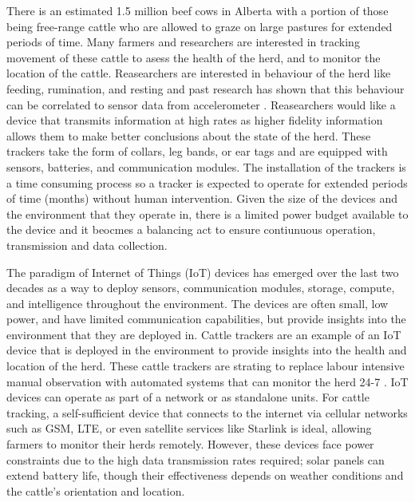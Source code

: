 \documentclass[10pt]{cai}
\begin{document}
There is an estimated 1.5 million beef cows in Alberta with a portion of those being free-range cattle who are allowed to graze on large pastures for extended periods of time.
Many farmers and researchers are interested in tracking movement of these cattle to asess the health of the herd, and to monitor the location of the cattle.
Reasearchers are interested in behaviour of the herd like feeding, rumination, and resting and past research has shown that this behaviour can be correlated to sensor data from accelerometer \cite{unoldIoTBasedCowHealth2020}.
Reasearchers would like a device that transmits information at high rates as higher fidelity information allows them to make better conclusions about the state of the herd.
These trackers take the form of collars, leg bands, or ear tags and are equipped with sensors, batteries, and communication modules.
The installation of the trackers is a time consuming process so a tracker is expected to operate for extended periods of time (months) without human intervention.
Given the size of the devices and the environment that they operate in, there is a limited power budget available to the device and it beocmes a balancing act to ensure contiunuous operation, transmission and data collection.

The paradigm of Internet of Things (IoT) devices has emerged over the last two decades as a way to deploy sensors, communication modules, storage, compute, and intelligence throughout the environment.
The devices are often small, low power, and have limited communication capabilities, but provide insights into the environment that they are deployed in.
Cattle trackers are an example of an IoT device that is deployed in the environment to provide insights into the health and location of the herd.
These cattle trackers are strating to replace labour intensive manual observation with automated systems that can monitor the herd 24-7 \cite{unoldIoTBasedCowHealth2020} \cite{moutaouakilDigitalFarmingSurvey2023}.
IoT devices can operate as part of a network or as standalone units. 
For cattle tracking, a self-sufficient device that connects to the internet via cellular networks such as GSM, LTE, or even satellite services like Starlink is ideal, allowing farmers to monitor their herds remotely. 
However, these devices face power constraints due to the high data transmission rates required; solar panels can extend battery life, though their effectiveness depends on weather conditions and the cattle's orientation and location.
\end{document}
